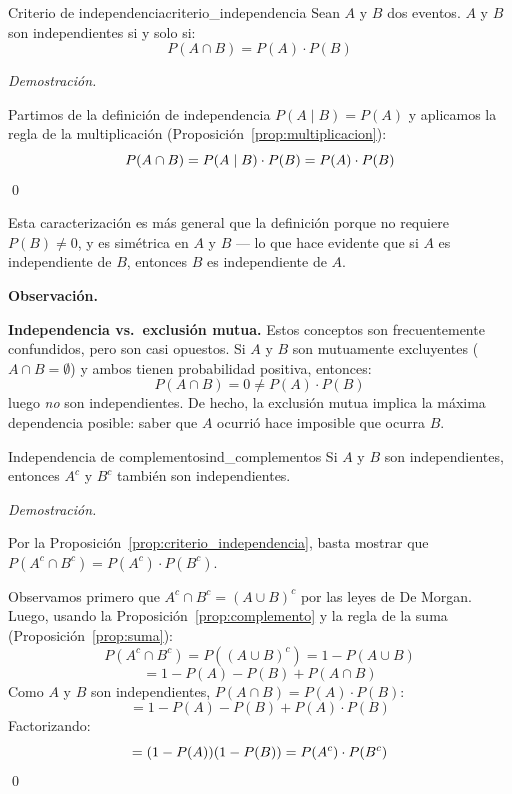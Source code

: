 \documentclass[12pt, a4paper]{book}
\newenvironment{observacion}{%
    \par\medskip\noindent\textbf{\color{azul}Observaci\'{o}n.}\enspace\itshape
}{\par\medskip}
\renewenvironment{proof}{%
    \par\medskip\noindent\textit{Demostraci\'{o}n.}\enspace
}{\qed\par\medskip}
\numberwithin{equation}{chapter}
\begin{document}
\begin{proposicion}{Criterio de independencia}{criterio_independencia}
	Sean $A$ y $B$ dos eventos. $A$ y $B$ son independientes si y solo 
	si:
	\[
	P(A \cap B) = P(A) \cdot P(B)
	\]
\end{proposicion}

\begin{proof}
	Partimos de la definición de independencia $P(A \mid B) = P(A)$ y 
	aplicamos la regla de la multiplicación 
	(Proposición~\ref{prop:multiplicacion}):
	\[
	P(A \cap B) = P(A \mid B) \cdot P(B) = P(A) \cdot P(B) \qedhere
	\]
\end{proof}

Esta caracterización es más general que la definición porque no requiere 
$P(B) \neq 0$, y es simétrica en $A$ y $B$ — lo que hace evidente que 
si $A$ es independiente de $B$, entonces $B$ es independiente de $A$.

\begin{observacion}
	\textbf{Independencia vs.\ exclusión mutua.} Estos conceptos son 
	frecuentemente confundidos, pero son casi opuestos. Si $A$ y $B$ 
	son mutuamente excluyentes ($A \cap B = \emptyset$) y ambos tienen 
	probabilidad positiva, entonces:
	\[
	P(A \cap B) = 0 \neq P(A) \cdot P(B)
	\]
	luego \textit{no} son independientes. De hecho, la exclusión mutua 
	implica la máxima dependencia posible: saber que $A$ ocurrió hace 
	imposible que ocurra $B$.
\end{observacion}

\begin{proposicion}{Independencia de complementos}{ind_complementos}
	Si $A$ y $B$ son independientes, entonces $A^c$ y $B^c$ también 
	son independientes.
\end{proposicion}

\begin{proof}
	Por la Proposición~\ref{prop:criterio_independencia}, basta mostrar 
	que $P(A^c \cap B^c) = P(A^c) \cdot P(B^c)$.
	
	\medskip
	Observamos primero que $A^c \cap B^c = (A \cup B)^c$ por las leyes 
	de De Morgan. Luego, usando la Proposición~\ref{prop:complemento} 
	y la regla de la suma (Proposición~\ref{prop:suma}):
	\[
	P(A^c \cap B^c) = P((A \cup B)^c) = 1 - P(A \cup B)
	\]
	\[
	= 1 - P(A) - P(B) + P(A \cap B)
	\]
	Como $A$ y $B$ son independientes, $P(A \cap B) = P(A) \cdot P(B)$:
	\[
	= 1 - P(A) - P(B) + P(A) \cdot P(B)
	\]
	Factorizando:
	\[
	= (1 - P(A))(1 - P(B)) = P(A^c) \cdot P(B^c) \qedhere
	\]
\end{proof}
\end{document}
